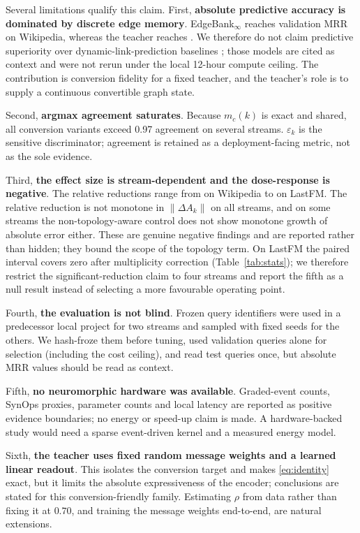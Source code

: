 \documentclass[preprint,12pt]{elsarticle}
\begin{document}
Several limitations qualify this claim. First, \textbf{absolute predictive accuracy is dominated by discrete edge memory}. EdgeBank$_\infty$ reaches validation MRR \EdgeBankWiki{} on Wikipedia, whereas the teacher reaches \TeacherMRRWiki{}. We therefore do not claim predictive superiority over dynamic-link-prediction baselines \cite{rossi2020tgn,yu2023dyglib,cong2023graphmixer,gao2025hyperevent}; those models are cited as context and were not rerun under the local 12-hour compute ceiling. The contribution is conversion fidelity for a fixed teacher, and the teacher's role is to supply a continuous convertible graph state.

Second, \textbf{argmax agreement saturates}. Because $m_c(k)$ is exact and shared, all conversion variants exceed 0.97 agreement on several streams. $\varepsilon_k$ is the sensitive discriminator; agreement is retained as a deployment-facing metric, not as the sole evidence.

Third, \textbf{the effect size is stream-dependent and the dose-response is negative}. The relative reductions range from \RedWiki{} on Wikipedia to \RedLastfm{} on LastFM. The relative reduction is not monotone in $\|\Delta A_k\|$ on all streams, and on some streams the non-topology-aware control does not show monotone growth of absolute error either. These are genuine negative findings and are reported rather than hidden; they bound the scope of the topology term. On LastFM the paired interval covers zero after multiplicity correction (Table~\ref{tab:stats}); we therefore restrict the significant-reduction claim to four streams and report the fifth as a null result instead of selecting a more favourable operating point.

Fourth, \textbf{the evaluation is not blind}. Frozen query identifiers were used in a predecessor local project for two streams and sampled with fixed seeds for the others. We hash-froze them before tuning, used validation queries alone for selection (including the cost ceiling), and read test queries once, but absolute MRR values should be read as context.

Fifth, \textbf{no neuromorphic hardware was available}. Graded-event counts, SynOps proxies, parameter counts and local latency are reported as positive evidence boundaries; no energy or speed-up claim is made. A hardware-backed study would need a sparse event-driven kernel and a measured energy model.

Sixth, \textbf{the teacher uses fixed random message weights and a learned linear readout}. This isolates the conversion target and makes \eqref{eq:identity} exact, but it limits the absolute expressiveness of the encoder; conclusions are stated for this conversion-friendly family. Estimating $\rho$ from data rather than fixing it at $0.70$, and training the message weights end-to-end, are natural extensions.
\end{document}

